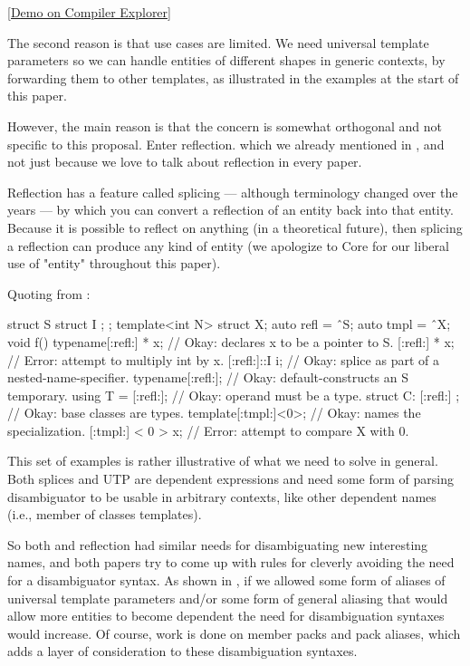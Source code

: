 \documentclass{wg21}
\begin{document}
\href{https://godbolt.org/z/oTPGvEYoa}{[Demo on Compiler Explorer]}

The second reason is that use cases are limited.
We need universal template parameters so we can handle entities of different shapes in generic contexts, by forwarding them to other templates, as illustrated in the examples at the start of this paper.

However, the main reason is that the concern is somewhat orthogonal and not specific to this proposal.
Enter reflection. which we already mentioned in , and not just because we love to talk about reflection in every paper.

Reflection has a feature called splicing --- although terminology changed over the years --- by which you can convert a reflection of an entity
back into that entity. Because it is possible to reflect on anything (in a theoretical future), then splicing a reflection
can produce any kind of entity (we apologize to Core for our liberal use of "entity" throughout this paper).

Quoting from :

\begin{quoteblock}
\begin{colorblock}
struct S { struct I { }; };
template<int N> struct X;
auto refl = ˆS;
auto tmpl = ˆX;
void f() {
    typename[:refl:] * x; // Okay: declares x to be a pointer to S.
    [:refl:] * x; // Error: attempt to multiply int by x.
    [:refl:]::I i; // Okay: splice as part of a nested-name-specifier.
    typename[:refl:]{}; // Okay: default-constructs an S temporary.
    using T = [:refl:]; // Okay: operand must be a type.
    struct C: [:refl:] {}; // Okay: base classes are types.
    template[:tmpl:]<0>; // Okay: names the specialization.
    [:tmpl:] < 0 > x; // Error: attempt to compare X with 0.
}
\end{colorblock}
\end{quoteblock}

This set of examples is rather illustrative of what we need to solve in general.
Both splices and UTP are dependent expressions and need some form of parsing disambiguator to be usable
in arbitrary contexts, like other dependent names (i.e., member of classes templates).

So both  and reflection had similar needs for disambiguating new interesting names, and
both papers try to come up with rules for cleverly avoiding the need for a disambiguator syntax.
As shown in , if we allowed some form of aliases of universal template parameters and/or some form of general aliasing that would allow more entities to become dependent
the need for disambiguation syntaxes would increase.
Of course, work is done on member packs and pack aliases, which adds a layer of consideration to these disambiguation syntaxes.
\end{document}
